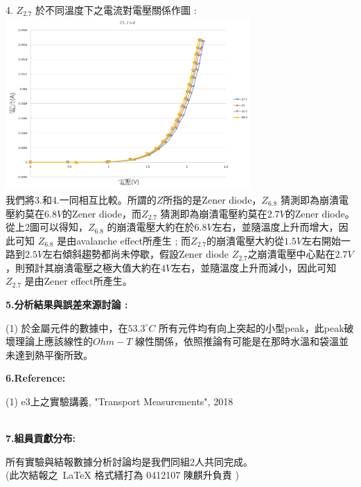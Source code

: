 \documentclass[UTF8]{ctexart}
\begin{document}
\begin{CJK*}{UTF8}{song}
4. $Z_{2.7}$ 於不同溫度下之電流對電壓關係作圖 :  \\
\includegraphics[width = 0.7\textwidth]{z27All.png} \\
我們將3.和4.一同相互比較。所謂的$Z$所指的是Zener diode，$Z_{6.8}$ 猜測即為崩潰電壓約莫在$6.8V$的Zener diode，而$Z_{2.7}$ 猜測即為崩潰電壓約莫在$2.7V$的Zener diode。 從上2圖可以得知，$Z_{6.8}$ 的崩潰電壓大約在於$6.8V$左右，並隨溫度上升而增大，因此可知 $Z_{6.8}$ 是由avalanche effect所產生 ; 而$Z_{2.7}$的崩潰電壓大約從$1.5V$左右開始一路到$2.5V$左右傾斜趨勢都尚未停歇，假設Zener diode $Z_{2.7}$之崩潰電壓中心點在$2.7V$，則預計其崩潰電壓之極大值大約在$4V$左右，並隨溫度上升而減小，因此可知 $Z_{2.7}$ 是由Zener effect所產生。\\



\begin{large}
\textbf{5.分析結果與誤差來源討論 :} \\
\end{large}
(1) 於金屬元件的數據中，在$53.3^{\circ}C$ 所有元件均有向上突起的小型peak，此peak破壞理論上應該線性的$Ohm-T$ 線性關係，依照推論有可能是在那時水溫和袋溫並未達到熱平衡所致。 \\


  %


\begin{large}
\textbf{6.Reference: } \\
\end{large}
(1) e3上之實驗講義, "Transport Measurements", 2018 \\
 \\


\begin{large}
\textbf{7.組員貢獻分布: } \\
\end{large}
所有實驗與結報數據分析討論均是我們同組2人共同完成。 \\
(此次結報之~\LaTeX{} 格式繕打為 0412107 陳麒升負責 )


\end{CJK*}
\end{document}
